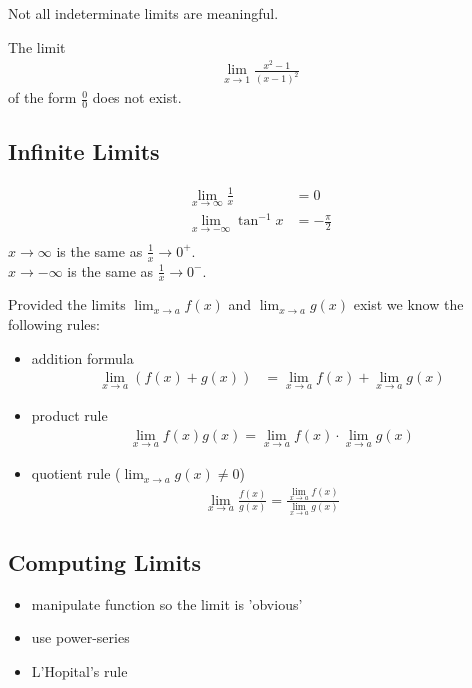 \begin{rk}
Not all indeterminate limits are meaningful.
\end{rk}

\begin{ex}
The limit
\begin{align*}
\lim_{x \to 1} \frac{x^2-1}{(x-1)^2}
\end{align*}
of the form $\frac 0 0$ does not exist.
\end{ex}

\subsection{Infinite Limits}
\begin{ex}
\begin{align*}
\lim_{x \to \infty} \frac 1 x & = 0 \\
\lim_{x \to -\infty} \tan^{-1} x & = -\frac \pi 2 \\
\end{align*}
$x \to \infty$ is the same as $\frac 1 x \to 0^+$. \\
$x \to -\infty$ is the same as $\frac 1 x \to 0^-$.
\end{ex}
\begin{pr} 
Provided the limits $\lim_{x \to a} f(x)$ and $\lim_{x \to a} g(x)$ exist we know the following rules:
\begin{itemize}
\item
addition formula
\begin{align*}
 \lim_{x \to a} (f(x) +g(x) ) & = \lim_{x \to a} f(x) + \lim_{x \to a} g(x)
\end{align*}
\item 
product rule
\begin{align*}
\lim_{x \to a} f(x) g(x) = \lim_{x \to a} f(x) \cdot \lim_{x \to a} g(x)
\end{align*}
\item quotient rule ($\lim_{x \to a} g(x) \neq 0$)
\begin{align*}
\lim_{x \to a} \frac{f(x)}{g(x)} = \frac{\lim_{x \to a} f(x)}{\lim_{x \to a} g(x)}
\end{align*}
\end{itemize}
\end{pr}

\subsection{Computing Limits}
\begin{itemize}
\item 
manipulate function so the limit is 'obvious'
\item
use power-series
\item
L'Hopital's rule
\end{itemize}

